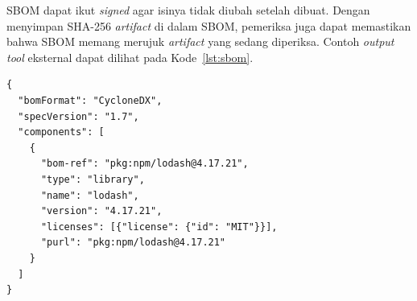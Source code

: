 SBOM dapat ikut \textit{signed} agar isinya tidak diubah setelah dibuat. Dengan menyimpan
SHA-256 \textit{artifact} di dalam SBOM, pemeriksa juga dapat memastikan bahwa SBOM memang merujuk
\textit{artifact} yang sedang diperiksa. Contoh \textit{output} \textit{tool} eksternal dapat dilihat pada Kode~\ref{lst:sbom}.

\begin{lstlisting}[basicstyle=\ttfamily\footnotesize,caption={Potongan SBOM CycloneDX yang dihasilkan Trivy},label={lst:sbom},numbers=none]
{
  "bomFormat": "CycloneDX",
  "specVersion": "1.7",
  "components": [
    {
      "bom-ref": "pkg:npm/lodash@4.17.21",
      "type": "library",
      "name": "lodash",
      "version": "4.17.21",
      "licenses": [{"license": {"id": "MIT"}}],
      "purl": "pkg:npm/lodash@4.17.21"
    }
  ]
}
\end{lstlisting}
